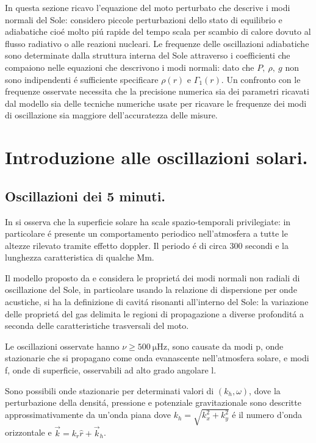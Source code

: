 \documentclass[../main.tex]{subfiles}
\begin{document}
In questa sezione ricavo l'equazione del moto perturbato che descrive i modi normali del Sole: considero piccole perturbazioni dello stato di equilibrio e adiabatiche cio\'e molto pi\'u rapide del tempo scala per scambio di calore dovuto al flusso radiativo o alle reazioni nucleari. Le frequenze delle oscillazioni adiabatiche sono determinate dalla struttura interna del Sole attraverso i coefficienti che compaiono nelle equazioni che descrivono i modi normali: dato che $P,\ \rho,\ g$ non sono indipendenti \'e sufficiente specificare $\rho(r)$ e $\Gamma_1(r)$. Un confronto con le frequenze osservate necessita che la precisione numerica sia dei parametri ricavati dal modello sia delle tecniche numeriche usate per ricavare le frequenze dei modi di oscillazione sia maggiore dell'accuratezza delle misure.


{\let\clearpage\relax \chapter{Introduzione alle oscillazioni solari.}} %


\section{Oscillazioni dei 5 minuti.}

In \citet{lei62velocity} si osserva che la superficie solare ha scale spazio-temporali privilegiate: in particolare \'e presente un comportamento periodico nell'atmosfera a tutte le altezze rilevato tramite effetto doppler. Il periodo \'e di circa 300 secondi e la lunghezza caratteristica di qualche \si{\mega\meter}.

Il modello proposto da \citet{ulrich70five} e \citet*{stein71five} considera le propriet\'a dei modi normali non radiali di oscillazione del Sole, in particolare usando la relazione di dispersione per onde acustiche, si ha la definizione di cavit\'a risonanti all'interno del Sole: la variazione delle propriet\'a del gas delimita le regioni di propagazione a diverse profondit\'a a seconda delle caratteristiche trasversali del moto. 

Le oscillazioni osservate hanno $\nu\geq\SI{500}{\micro\hertz}$, sono causate da modi p, onde stazionarie che si propagano come onda evanascente nell'atmosfera solare, e modi f, onde di superficie, osservabili ad alto grado angolare l.

Sono possibili onde stazionarie per determinati valori di  $(k_h,\omega)$, dove la perturbazione della densit\'a, pressione e potenziale gravitazionale sono descritte approssimativamente da un'onda piana dove $k_h=\sqrt{k_x^2+k_y^2}$ \'e il numero d'onda orizzontale e $\vec{k}=k_r\hat{r}+\vec{k}_h$.
\end{document}
